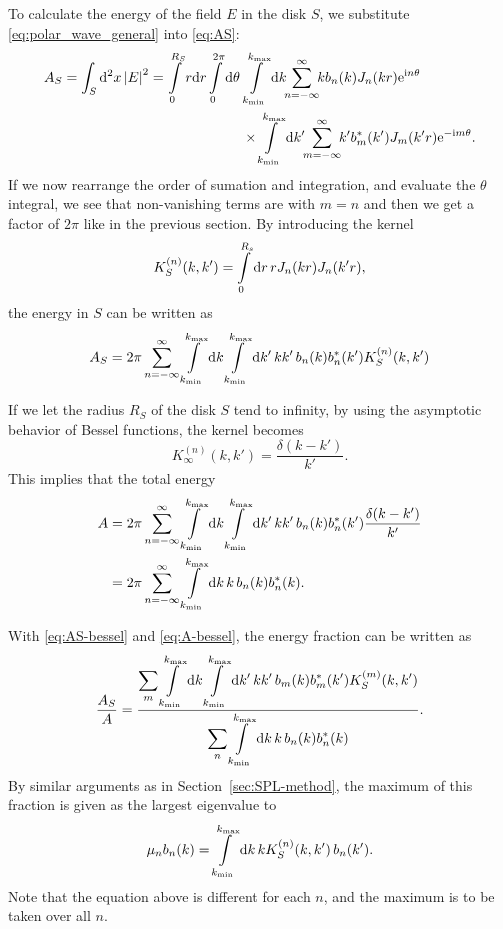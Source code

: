 \documentclass[11pt,a4paper, 
swedish,english %
]{article}
\begin{document}
To calculate the energy of the field $E$ in the disk $S$, we
substitute \eqref{eq:polar_wave_general} into \eqref{eq:AS}: 
\begin{equation}
\begin{aligned}
A_S= \oldint_S \rd^2x\, \abs{E}^2 = 
\int_0^{R_S} r\rd{r} \int_0^{2\pi} \rd\theta \,&
\int_{k_{\min}}^{k_{\max}} \rd{k}\!\!
\sum_{n= -\infty}^{\infty}\!\! kb_n(k) J_n(kr)\ee^{\ii n \theta}\\
&\times
\int_{k_{\min}}^{k_{\max}} \rd{k'}\!\!
\sum_{m= -\infty}^{\infty}\!\! k'b_m^*(k') J_m(k'r)\ee^{-\ii m
  \theta}.
\end{aligned}
\end{equation}
If we now rearrange the order of sumation and integration, and
evaluate the $\theta$ integral, we see that non-vanishing terms are
with $m=n$ and then we get a factor of $2\pi$ like in the previous
section. By introducing the kernel 
\begin{equation}\label{eq:KS-bessel}
K_S^{(n)}(k, k') = \int_{0}^{R_s} \rd{r}\, r J_n(kr) J_n(k'r),
\end{equation}
the energy in $S$ can be written as
\begin{equation}\label{eq:AS-bessel}
A_S =2\pi \sum_{n=-\infty}^{\infty} 
\int_{k_{\min}}^{k_{\max}} \rd{k} \int_{k_{\min}}^{k_{\max}} \rd{k'}\,  
kk'\, b_n(k)b_n^*(k') K_S^{(n)}(k, k')
\end{equation}

If we let the radius $R_S$ of the disk $S$ tend to infinity, by
using the asymptotic behavior of Bessel functions, the kernel becomes
\begin{equation}
K_\infty^{(n)}(k,k') = \frac{\delta(k-k')}{k'}.
\end{equation}
This implies that the total energy
\begin{equation}\label{eq:A-bessel}
\begin{aligned}
A &=2\pi \sum_{n=-\infty}^{\infty} 
\int_{k_{\min}}^{k_{\max}} \rd{k} \int_{k_{\min}}^{k_{\max}} \rd{k'}\,  
kk'\, b_n(k)b_n^*(k') \frac{\delta(k-k')}{k'} \\
&=2\pi \sum_{n=-\infty}^{\infty} 
\int_{k_{\min}}^{k_{\max}} \rd{k} \, k\, b_n(k)b_n^*(k).
\end{aligned}
\end{equation}

With \eqref{eq:AS-bessel} and \eqref{eq:A-bessel}, the energy fraction
can be written as
\begin{equation}\label{eq:E-frac-bessel}
\frac{A_S}{A}
=\frac{\displaystyle{\sum_{m}} \int_{k_{\min}}^{k_{\max}} \rd{k} \int_{k_{\min}}^{k_{\max}} \rd{k'}\,  
kk'\, b_m(k)b_m^*(k') K_S^{(m)}(k, k')}
{\displaystyle{\sum_{n}} \int_{k_{\min}}^{k_{\max}} \rd{k} \, k\, b_n(k)b_n^*(k)}.
\end{equation}
By similar arguments as in Section~\ref{sec:SPL-method}, the maximum
of this fraction is given as the largest eigenvalue to
\begin{equation}
\mu_nb_n(k) = \int_{k_{\min}}^{{k_{\max}}}\rd{k}\,k K_S^{(n)}(k, k')\,b_n(k').
\end{equation}
Note that the equation above is different for each $n$, and the
maximum is to be taken over all $n$.
\end{document}
